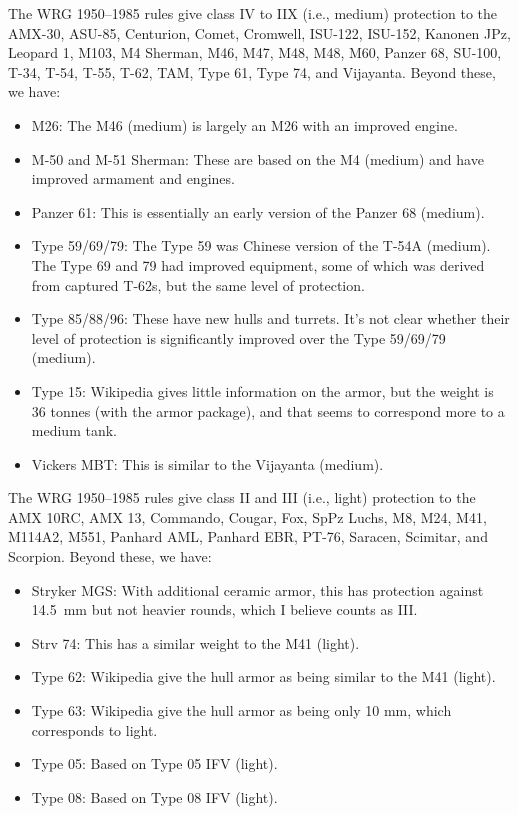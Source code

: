 \begin{withcounters}
{        
        The WRG 1950--1985 rules give class IV to IIX (i.e., medium) protection to the
        AMX-30,
        ASU-85,
        Centurion,
        Comet,
        Cromwell,
        ISU-122,
        ISU-152,
        Kanonen JPz,
        Leopard 1,
        M103,
        M4 Sherman,
        M46,
        M47,
        M48,
        M48,
        M60,
        Panzer 68,
        SU-100,
        T-34,
        T-54,
        T-55,
        T-62,
        TAM,
        Type 61,
        Type 74, and
        Vijayanta.
        Beyond these, we have:
        \begin{itemize}
            \item M26: The M46 (medium) is largely an M26 with an improved engine.
            \item M-50 and M-51 Sherman: These are based on the M4 (medium) and have improved armament and engines.
            \item Panzer 61: This is essentially an early version of the Panzer 68 (medium).
            \item Type 59/69/79: The Type 59 was Chinese version of the T-54A (medium). The Type 69 and 79 had improved equipment, some of which was derived from captured T-62s, but the same level of protection.
            \item Type 85/88/96: These have new hulls and turrets. It's not clear whether their level of protection is significantly improved over the Type 59/69/79 (medium).
            \item Type 15: Wikipedia gives little information on the armor, but the weight is 36 tonnes (with the armor package), and that seems to correspond more to a medium tank.
            \item Vickers MBT: This is similar to the Vijayanta (medium).
        \end{itemize}

        The WRG 1950--1985 rules give class II and III (i.e., light) protection to the
        AMX 10RC,
        AMX 13,
        Commando,
        Cougar,
        Fox,
        SpPz Luchs,
        M8,
        M24,
        M41,
        M114A2,
        M551,
        Panhard AML,
        Panhard EBR,
        PT-76,
        Saracen,
        Scimitar, and
        Scorpion.
        Beyond these, we have:
        \begin{itemize}
            \item Stryker MGS: With additional ceramic armor, this has protection against 14.5~mm but not heavier rounds, which I believe counts as III.
            \item Strv 74: This has a similar weight to the M41 (light).
            \item Type 62: Wikipedia give the hull armor as being similar to the M41 (light).
            \item Type 63: Wikipedia give the hull armor as being only 10 mm, which corresponds to light.
            \item Type 05: Based on Type 05 IFV (light).
            \item Type 08: Based on Type 08 IFV (light).
        \end{itemize}

}
\end{withcounters}
